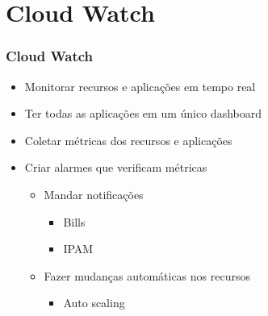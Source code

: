 \section{Cloud Watch}

\begin{frame}
	\frametitle{Cloud Watch}
	\begin{itemize}
		\item Monitorar recursos e aplicações em tempo real
		\item Ter todas as aplicações em um único dashboard
		\item Coletar métricas dos recursos e aplicações
		\item Criar alarmes que verificam métricas
			\begin{itemize}
				\item Mandar notificações
					\begin{itemize}
						\item Bills
						\item IPAM
					\end{itemize}
				\item Fazer mudanças automáticas nos recursos
					\begin{itemize}
						\item Auto scaling
					\end{itemize}
			\end{itemize}
	\end{itemize}
\end{frame}
